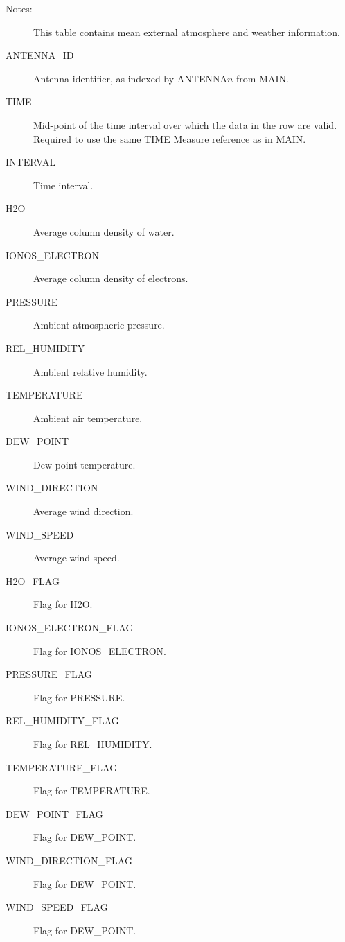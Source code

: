 \documentclass{article}
\begin{document}
\begin{description}

\item[Notes:] This table contains mean external atmosphere and weather
information.

\item[ANTENNA\_ID] Antenna identifier, as indexed by ANTENNA$n$ from MAIN.

\item[TIME] Mid-point of the time interval over which the data in the
row are valid. Required to use the same TIME Measure reference as in
MAIN.

\item[INTERVAL] Time interval.

\item[H2O] Average column density of water.

\item[IONOS\_ELECTRON] Average column density of electrons.

\item[PRESSURE] Ambient atmospheric pressure.

\item[REL\_HUMIDITY] Ambient relative humidity.

\item[TEMPERATURE] Ambient air temperature.

\item[DEW\_POINT] Dew point temperature.

\item[WIND\_DIRECTION] Average wind direction.

\item[WIND\_SPEED] Average wind speed.

\item[H2O\_FLAG] Flag for H2O.

\item[IONOS\_ELECTRON\_FLAG] Flag for IONOS\_ELECTRON.

\item[PRESSURE\_FLAG] Flag for PRESSURE.

\item[REL\_HUMIDITY\_FLAG] Flag for REL\_HUMIDITY.

\item[TEMPERATURE\_FLAG] Flag for TEMPERATURE.

\item[DEW\_POINT\_FLAG] Flag for DEW\_POINT.

\item[WIND\_DIRECTION\_FLAG] Flag for DEW\_POINT.

\item[WIND\_SPEED\_FLAG] Flag for DEW\_POINT.

\end{description}
\end{document}
